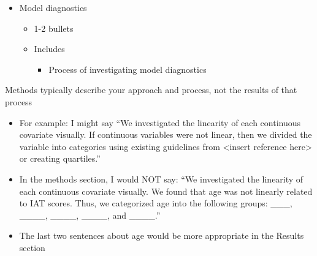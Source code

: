 \documentclass[
  letterpaper,
  DIV=11,
  numbers=noendperiod]{scrartcl}
\providecommand{\tightlist}{%
  \setlength{\itemsep}{0pt}\setlength{\parskip}{0pt}}\usepackage{longtable,booktabs,array}
\begin{document}
\begin{itemize}
\begin{itemize}
    \begin{itemize}
    \tightlist
    \item
      1 bullet
    \item
      Write out your final model: It can be an equation, but a list
      might be nicer.

      \begin{itemize}
      \tightlist
      \item
        Example: Our final model included main effects for \_\_\_\_ and
        an interaction between \_\_ and \_\_.
      \end{itemize}
    \end{itemize}
  \item
    Model diagnostics

    \begin{itemize}
    \tightlist
    \item
      1-2 bullets
    \item
      Includes

      \begin{itemize}
      \tightlist
      \item
        Process of investigating model diagnostics
      \end{itemize}
    \end{itemize}
  \end{itemize}
\end{itemize}

\begin{tcolorbox}[enhanced jigsaw, coltitle=black, bottomtitle=1mm, breakable, opacityback=0, toprule=.15mm, left=2mm, opacitybacktitle=0.6, rightrule=.15mm, colframe=quarto-callout-caution-color-frame, toptitle=1mm, bottomrule=.15mm, arc=.35mm, titlerule=0mm, title=\textcolor{quarto-callout-caution-color}{\faFire}\hspace{0.5em}{Important to keep in mind}, leftrule=.75mm, colbacktitle=quarto-callout-caution-color!10!white, colback=white]

Methods typically describe your approach and process, not the results of
that process

\begin{itemize}
\tightlist
\item
  For example: I might say ``We investigated the linearity of each
  continuous covariate visually. If continuous variables were not
  linear, then we divided the variable into categories using existing
  guidelines from \textless insert reference here\textgreater{} or
  creating quartiles.''
\item
  In the methods section, I would NOT say: ``We investigated the
  linearity of each continuous covariate visually. We found that age was
  not linearly related to IAT scores. Thus, we categorized age into the
  following groups: \_\_\_, \_\_\_\_, \_\_\_\_, \_\_\_\_, and
  \_\_\_\_.''
\item
  The last two sentences about age would be more appropriate in the
  Results section
\end{itemize}

\end{tcolorbox}
\end{document}
